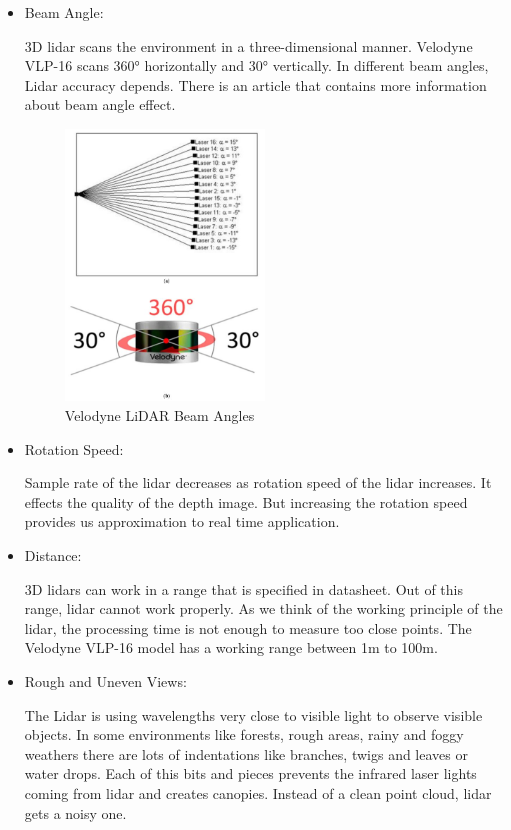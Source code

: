 \documentclass[12pt]{article}
\begin{document}
\begin{itemize}
    \item Beam Angle:

          3D lidar scans the environment in a three-dimensional manner. Velodyne VLP-16 scans 360° horizontally and 30° vertically. In different beam angles, Lidar accuracy depends. There is an article that contains more information about beam angle effect.

          \begin{figure}[H]
              \centering
              \includegraphics[width=0.5\textwidth]{LidarAngles.jpeg}
              \caption{Velodyne LiDAR Beam Angles~\cite{VelodynePerformance}}
          \end{figure}

    \item Rotation Speed:

          Sample rate of the lidar decreases as rotation speed of the lidar increases. It effects the quality of the depth image. But increasing the rotation speed provides us approximation to real time application.

    \item Distance:

          3D lidars can work in a range that is specified in datasheet. Out of this range, lidar cannot work properly. As we think of the working principle of the lidar, the processing time is not enough to measure too close points. The Velodyne VLP-16 model has a working range between 1m to 100m.

    \item Rough and Uneven Views:

          The Lidar is using wavelengths very close to visible light to observe visible objects. In some environments like forests, rough areas, rainy and foggy weathers there are lots of indentations like branches, twigs and leaves or water drops. Each of this bits and pieces prevents the infrared laser lights coming from lidar and creates canopies. Instead of a clean point cloud, lidar gets a noisy one.


\end{itemize}
\end{document}
